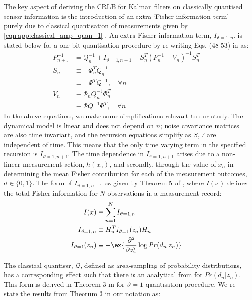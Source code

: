 The key aspect of deriving the CRLB for Kalman filters on classically quantised sensor information is the introduction of an extra `Fisher information term' purely due to classical quantisation of measurements given by \cref{eqn:app:classical_amp_quan_1}  \cite{karlsson2005}. An extra Fisher information term, $I_{\vartheta=1, n}$, is stated below for a one bit quantisation procedure by re-writing Eqs. (48-53) in \cite{karlsson2005} as:
\begin{align}
P_{n+1}^{-1} &= Q_n^{-1} + I_{\vartheta=1, n+1} - S_n^T(P^{-1}_n + V_n)^{-1} S^T_n \label{eqn:app:CRLB_recursion} \\
S_n &\equiv -\Phi_n^T Q_n^{-1} \\
&\equiv -\Phi^T Q^{-1}, \quad \forall n \\
V_n & \equiv \Phi_n Q_n^{-1} \Phi_n^T\\
& \equiv \Phi Q^{-1} \Phi^T , \quad \forall n 
\end{align} 
In the above equations, we make some simplifications relevant to our study. The dynamical model is linear and does not depend on $n$; noise covariance matrices are also time invariant, and the recursion equations simplify as $S, V$ are independent of time. This means that the only time varying term in the specified recursion is $I_{\vartheta=1, n+1}$. The time dependence in  $I_{\vartheta=1, n+1}$ arises due to a non-linear measurement action, $h(x_n)$, and secondly, through the value of $x_n$ in determining the mean Fisher contribution for each of the measurement outcomes, $d \in \{0,1\} $. The form of $I_{\vartheta=1, n+1}$ as given by Theorem 5 of \cite{karlsson2005}, where $I(x)$ defines the total Fisher information for $N$ observations in a measurement record:
\begin{align}
I(x) & \equiv \sum_{n=1}^{N} I_{\vartheta=1, n} \label{eqn:app:quantisedFisherinfo:total}\\
I_{\vartheta=1, n} & \equiv  H_n^T I_{\vartheta=1}(z_n) H_n  \label{eqn:app:quantisedFisherinfo:msmt}\\
I_{\vartheta=1}(z_n) & \equiv - \ex{\frac{\partial^2}{\partial z_n^2} \log Pr(d_n|z_n)} \label{eqn:app:quantisedFisherinfo}
\end{align}

The classical quantiser, $\mathcal{Q}$, defined as area-sampling of probability distributions, has a corresponding effect such that there is an analytical from for $Pr(d_n|z_n)$. This form is derived in Theorem 3 in \cite{karlsson2005} for $\vartheta=1$ quantisation procedure. We re-state the results from Theorum 3 in our notation as:


